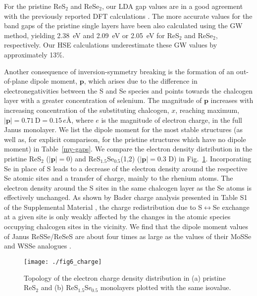 \documentclass[reprint, superscriptaddress, amsmath,amssymb,prb,twocolumn]{revtex4-2}
\def\SSeTwo{ReS$_{1.5}$Se$_{0.5}$}
\newcommand{\vect}[1]{\boldsymbol{#1}}	%
\begin{document}
For the pristine ReS$_{2}$ and ReSe$_{2}$, our LDA gap values are in a good agreement with the previously reported DFT calculations \cite{hart_prb_2021, zhong_prb_2015}. The more accurate values for the band gaps of the pristine single layers have been also calculated using the GW method, yielding 2.38~eV \cite{zhong_prb_2015, echeverry_prb_2018} and 2.09~eV \cite{zhong_prb_2015} or 2.05~eV \cite{echeverry_prb_2018} for ReS$_{2}$ and ReSe$_{2}$, respectively. Our HSE calculations underestimate these GW values by approximately 13\%.

Another consequence of inversion-symmetry breaking is the formation of an out-of-plane dipole moment, $\vect{p}$, which arises due to the difference in electronegativities between the S and Se species \cite{lu_natnano_2017, ji_jpcc_2018, Xia_2018, riis-jensen_jpcc_2018} and points towards the chalcogen layer with a greater concentration of selenium. The magnitude of $\vect{p}$ increases with increasing concentration of the substituting chalcogen, $x$, reaching maximum, $|\vect{p}|=0.71\,\mathrm{D}=0.15\,e$\AA, where $e$ is the magnitude of electron charge, in the full Janus monolayer. We list the dipole moment for the most stable structures (as well as, for explicit comparison, for the pristine structures which have no dipole moment) in Table~\ref{my-gaps}. We compare the electron density distribution in the pristine ReS$_{2}$ ($|\vect{p}|=0$) and \SSeTwo{}(1,2) ($|\vect{p}|=0.3$ D) in Fig.~\ref{fig:charge}. Incorporating Se in place of S leads to a decrease of the electron density around the respective Se atomic sites and a transfer of charge, mainly to the rhenium atoms. The electron density around the S sites in the same chalcogen layer as the Se atoms is effectively unchanged. As shown by Bader charge analysis \cite{bader_charge, henkelman_cms_2006} presented in Table S1 of the Supplemental Material \cite{SM}, the charge redistribution due to S$\leftrightarrow$Se exchange at a given site is only weakly affected by the changes in the atomic species occupying chalcogen sites in the vicinity. We find that the dipole moment values of Janus ReSSe/ReSeS are about four times as large as the values of their MoSSe and WSSe analogues \cite{Xia_2018, riis-jensen_jpcc_2018}.



\begin{figure}[!t]
\begin{center}
\texttt{[image: ./fig6\_charge]}
\caption{Topology of the electron charge density distribution in (a) pristine ReS$_2$ and (b) \SSeTwo{} monolayers plotted with the same isovalue.}
\label{fig:charge}
\end{center}
\end{figure}
\end{document}
